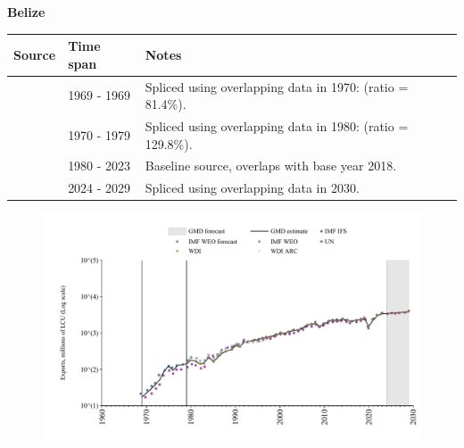 \documentclass[12pt,a4paper,landscape]{article}
\begin{document}
\begin{adjustbox}{max totalsize={\paperwidth}{\paperheight},center}
\begin{minipage}[t][\textheight][t]{\textwidth}
\vspace*{0.5cm}
{}
\begin{center}
{\Large\bfseries Belize}
\end{center}
\vspace{0.5cm}
\begin{table}[H]
\centering
\small
\begin{tabular}{|l|l|l|}
\hline
\textbf{Source} & \textbf{Time span} & \textbf{Notes} \\
\hline
\rowcolor{white}\cite{IMF_IFS}& 1969 - 1969 &Spliced using overlapping data in 1970: (ratio = 81.4\%).\\
\rowcolor{lightgray}\cite{UN}& 1970 - 1979 &Spliced using overlapping data in 1980: (ratio = 129.8\%).\\
\rowcolor{white}\cite{WDI}& 1980 - 2023 &Baseline source, overlaps with base year 2018.\\
\rowcolor{lightgray}\cite{IMF_WEO_forecast}& 2024 - 2029 &Spliced using overlapping data in 2030.\\
\hline
\end{tabular}
\end{table}
\begin{figure}[H]
\centering
\includegraphics[width=\textwidth,height=0.6\textheight,keepaspectratio]{graphs/BLZ_exports.pdf}
\end{figure}
\end{minipage}
\end{adjustbox}
\end{document}
